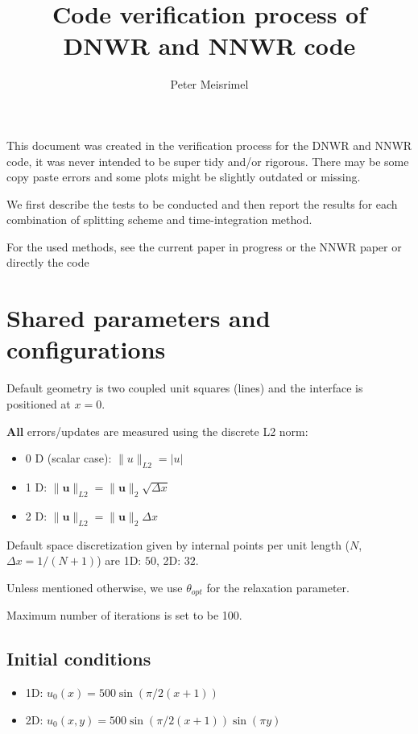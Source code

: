 \documentclass[a4paper,10pt]{article}
\title{Code verification process of DNWR and NNWR code}
\author{Peter Meisrimel}
\begin{document}
\maketitle

% 
This document was created in the verification process for the DNWR and NNWR code, it was never intended to be super tidy and/or rigorous. There may be some copy paste errors and some plots might be slightly outdated or missing.

We first describe the tests to be conducted and then report the results for each combination of splitting scheme and time-integration method.

For the used methods, see the current paper in progress or the NNWR paper or directly the code

\newpage
\tableofcontents
\listoftodos
\newpage

\section{Shared parameters and configurations}
Default geometry is two coupled unit squares (lines) and the interface is positioned at $x = 0$.

\textbf{All} errors/updates are measured using the discrete L2 norm:
% 
\begin{itemize}
\item 0 D (scalar case): $\|u\|_{L2} = |u|$
\item 1 D: $\|\bm{u}\|_{L2} = \|\bm{u}\|_2 \sqrt{\Delta x}$
\item 2 D: $\|\bm{u}\|_{L2} = \|\bm{u}\|_2 \Delta x$
\end{itemize}

Default space discretization given by internal points per unit length ($N$, $\Delta x = 1/(N+1)$) are 1D: $50$, 2D: $32$.

Unless mentioned otherwise, we use $\theta_{opt}$ for the relaxation parameter.

Maximum number of iterations is set to be 100.
% 
\subsection{Initial conditions}
% 
\begin{itemize}
\item 1D: $u_0(x) = 500\sin(\pi/2(x + 1))$
\item 2D: $u_0(x, y) = 500\sin(\pi/2(x + 1)) \sin(\pi y)$
\end{itemize}
% 
\end{document}
